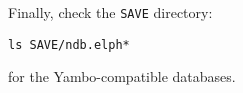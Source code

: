 \documentclass[12pt,twoside,openany]{book}
\renewcommand{\sectionmark}[1]{\markright{\thesection\ #1}}
\begin{document}
Finally, check the \texttt{SAVE} directory:

\begin{lstlisting}[]
ls SAVE/ndb.elph*
\end{lstlisting}

for the Yambo-compatible databases.

    
\cleardoublepage
\renewcommand{\sectionmark}[1]{\markright{#1}}


\end{document}

